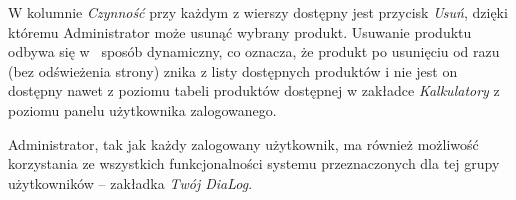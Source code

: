 W kolumnie \textit{Czynność} przy każdym z wierszy dostępny jest przycisk \textit{Usuń}, dzięki któremu Administrator może usunąć wybrany produkt. Usuwanie produktu odbywa się w~ sposób dynamiczny, co oznacza, że produkt po usunięciu od razu (bez odświeżenia strony) znika z listy dostępnych produktów i nie jest on dostępny nawet z poziomu tabeli produktów dostępnej w zakładce \textit{Kalkulatory} z poziomu panelu użytkownika zalogowanego. 

Administrator, tak jak każdy zalogowany użytkownik, ma również możliwość korzystania ze wszystkich funkcjonalności systemu przeznaczonych dla tej grupy użytkowników -- zakładka \textit{Twój DiaLog}.

